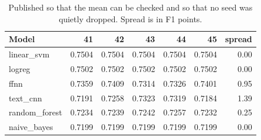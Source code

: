 \begin{table}[htbp]
\centering
\caption{Raw cross-repository F1 for every seed.}
\label{tab:seeds}
\begin{tabular}{lrrrrrr}
\toprule
Model & 41 & 42 & 43 & 44 & 45 & spread \\
\midrule
linear\_svm & 0.7504 & 0.7504 & 0.7504 & 0.7504 & 0.7504 & 0.00 \\
logreg & 0.7502 & 0.7502 & 0.7502 & 0.7502 & 0.7502 & 0.00 \\
ffnn & 0.7359 & 0.7409 & 0.7314 & 0.7326 & 0.7401 & 0.95 \\
text\_cnn & 0.7191 & 0.7258 & 0.7323 & 0.7319 & 0.7184 & 1.39 \\
random\_forest & 0.7234 & 0.7239 & 0.7242 & 0.7257 & 0.7232 & 0.25 \\
naive\_bayes & 0.7199 & 0.7199 & 0.7199 & 0.7199 & 0.7199 & 0.00 \\
\bottomrule
\end{tabular}
\caption*{\footnotesize Published so that the mean can be checked and so that no seed was quietly dropped. Spread is in F1 points.}
\end{table}
